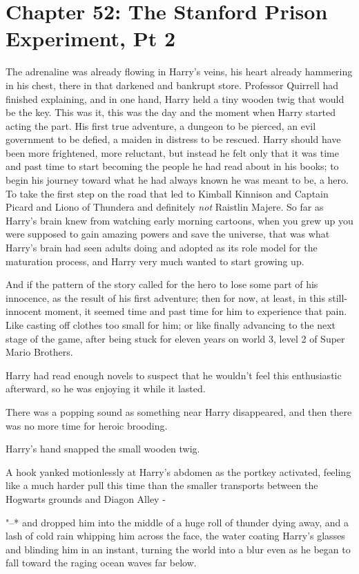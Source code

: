 \chapter{Chapter 52: The Stanford Prison Experiment, Pt 2}
The adrenaline was already flowing in Harry's veins, his heart already
hammering in his chest, there in that darkened and bankrupt store.
Professor Quirrell had finished explaining, and in one hand, Harry held
a tiny wooden twig that would be the key. This was it, this was the day
and the moment when Harry started acting the part. His first true
adventure, a dungeon to be pierced, an evil government to be defied, a
maiden in distress to be rescued. Harry should have been more
frightened, more reluctant, but instead he felt only that it was time
and past time to start becoming the people he had read about in his
books; to begin his journey toward what he had always known he was meant
to be, a hero. To take the first step on the road that led to Kimball
Kinnison and Captain Picard and Liono of Thundera and definitely
\emph{not} Raistlin Majere. So far as Harry's brain knew from watching
early morning cartoons, when you grew up you were supposed to gain
amazing powers and save the universe, that was what Harry's brain had
seen adults doing and adopted as its role model for the maturation
process, and Harry very much wanted to start growing up.

And if the pattern of the story called for the hero to lose some part of
his innocence, as the result of his first adventure; then for now, at
least, in this still-innocent moment, it seemed time and past time for
him to experience that pain. Like casting off clothes too small for him;
or like finally advancing to the next stage of the game, after being
stuck for eleven years on world 3, level 2 of Super Mario Brothers.

Harry had read enough novels to suspect that he wouldn't feel this
enthusiastic afterward, so he was enjoying it while it lasted.

There was a popping sound as something near Harry disappeared, and then
there was no more time for heroic brooding.

Harry's hand snapped the small wooden twig.

A hook yanked motionlessly at Harry's abdomen as the portkey activated,
feeling like a much harder pull this time than the smaller transports
between the Hogwarts grounds and Diagon Alley -

"--* and dropped him into the middle of a huge roll of thunder dying away,
and a lash of cold rain whipping him across the face, the water coating
Harry's glasses and blinding him in an instant, turning the world into a
blur even as he began to fall toward the raging ocean waves far below.

